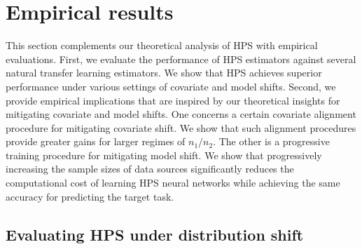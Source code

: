 \section{Empirical results}\label{sec_exp}

This section complements our theoretical analysis of HPS with empirical evaluations.
First, we evaluate the performance of HPS estimators against several natural transfer learning estimators.
We show that HPS achieves superior performance under various settings of covariate and model shifts.
Second, we provide empirical implications that are inspired by our theoretical insights for mitigating covariate and model shifts.
One concerns a certain covariate alignment procedure for mitigating covariate shift.
We show that such alignment procedures provide greater gains for larger regimes of $n_1 / n_2$.
The other is a progressive training procedure for mitigating model shift.
We show that progressively increasing the sample sizes of data sources significantly reduces the computational cost of learning HPS neural networks while achieving the same accuracy for predicting the target task.

\subsection{Evaluating HPS under distribution shift}\label{sec_diff}

